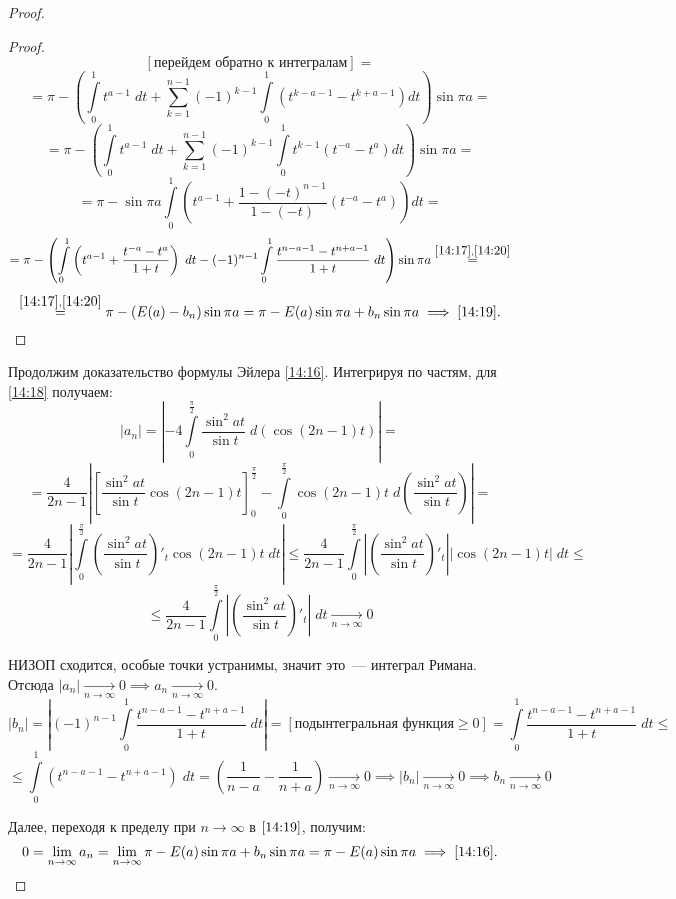 \documentclass[../../main.tex]{subfiles}
\begin{document}
\begin{proof}
\begin{proof}
\[				[\text{перейдем обратно к интегралам}] = \]
				\[ = \pi - \left( \int\limits_{0}^{1} t^{a-1} \; dt + \sum_{k=1}^{n-1} 
				(-1)^{k-1} \int\limits_{0}^{1} \left( t^{k-a-1} - t^{k+a - 1} \right) dt 
				\right)  \sin{\pi a}  = \]
				\[  =  \pi - \left( \int\limits_{0}^{1} t^{a-1} \; dt + \sum_{k=1}^{n-1} 
				(-1)^{k-1} \int\limits_{0}^{1} t^{k-1} \left( t^{-a} - t^{a} \right) dt 
				\right)  \sin{\pi a} =  \]
				\[  = \pi - \sin{\pi a} \int\limits_{0}^{1} \left( t^{a-1} + 
				\frac{1-(-t)^{n-1}}{1-(-t)}\left( t^{-a} - t^{a} \right) \right) dt  = \]
				\[ = \pi - \left( \int\limits_{0}^{1} \left( t^{a-1} + \frac{t^{-a} - 
				t^a}{1+t} \right) \; dt - (-1)^{n-1} \int\limits_{0}^{1} \frac{t^{n-a-1} - 
				t^{n+a-1}}{1+t} \; dt   \right) \sin{\pi a}  \stackrel{\eqref{14:17}, 
				\eqref{14:20}}= \]
				\[ \stackrel{\eqref{14:17}, \eqref{14:20}}= \pi - \left( E(a) - b_n 
				\right) \sin{\pi a} = \pi - E(a) \sin{\pi a} + b_n \sin{\pi a} \implies 
				\eqref{14:19}. 
				\qedhere \]
			\end{proof}	
			
		Продолжим доказательство формулы Эйлера \eqref{14:16}. Интегрируя по 
		частям, для \eqref{14:18} получаем:
		\[  \left| a_n \right|   = \left| -4 \int\limits_{0}^{\frac{\pi}{2}} 
		\frac{\sin^2{at}}{\sin{t}} \; d\left( \cos{(2n-1)t}\right)   \right|  =\]
		\[ = \frac{4}{2n-1} \left| \left[ \frac{\sin^2{at}}{\sin{t}} \cos{(2n-1)t} 
		\right]_{0}^{\frac{\pi}{2}} -\int\limits_{0}^{\frac{\pi}{2}} \cos{(2n-1)t} 
		\; d\left( \frac{\sin^2{at}}{\sin{t}} \right)   \right| =     \]
		\[  = \frac{4}{2n-1}\left| \int\limits_{0}^{\frac{\pi}{2}} \left( 
		\frac{\sin^2{at}}{\sin{t}} \right)'_t \cos{(2n-1)t} \; dt \right|  \le  
		\frac{4}{2n-1} \int\limits_{0}^{\frac{\pi}{2}} \left| \left( 
		\frac{\sin^2{at}}{\sin{t}} \right)'_t \right| \left|\cos{(2n-1)t}\right| \; 
		dt  \le\]
		\[ \le \frac{4}{2n-1} \int\limits_{0}^{\frac{\pi}{2}} \left| \left( 
		\frac{\sin^2{at}}{\sin{t}} \right)'_t \right| \; dt  {\underset{n \to 
		\infty}\rightarrow} 0 \]
		
		НИЗОП сходится, особые точки устранимы, значит это~--- интеграл Римана. 
		Отсюда 
		$\left| a_n \right|{\underset{n \to \infty}\longrightarrow} 0 \implies   a_n 
		{\underset{n \to \infty}\longrightarrow} 0$.
		\[  \left| b_n \right| = \left| (-1)^{n-1} \int\limits_{0}^{1} 
		\frac{t^{n-a-1} - t^{n+a-1}}{1+t} \; dt \right| = \left[
		\text{подынтегральная функция} \ge 0 \right] =  \int\limits_{0}^{1} 
		\frac{t^{n-a-1} - t^{n+a-1}}{1+t} \; dt \le  \]
		\[  \le \int\limits_{0}^{1} (t^{n-a-1} - t^{n+a-1})\; dt = \left(  
		\frac{1}{n-a} - \frac{1}{n+a}\right)  {\underset{n \to 
		\infty}\longrightarrow} 0  \implies  \left| b_n \right| {\underset{n \to 
		\infty}\longrightarrow} 0  \implies   b_n  {\underset{n \to 
		\infty}\longrightarrow} 0  \]
		
		Далее, переходя к пределу при $n \to \infty$ в $\eqref{14:19}$, получим:
		\[ 0 = \lim_{n \to \infty} a_n =  \lim_{n \to \infty} \pi - E(a) \sin{\pi a} 
		+ 
		b_n \sin{\pi a} = \pi - E(a) \sin{\pi a} \implies \eqref{14:16}. \qedhere\]
\end{proof}
\end{document}
